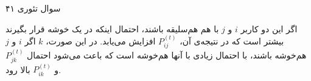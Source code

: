 سوال تئوری ۴۱

اگر این دو کاربر 
$i$
و 
$j$
با هم هم‌سلیقه باشند، احتمال اینکه در یک خوشه قرار بگیرند بیشتر است که در نتیجه‌ی آن،
$P_{ij}^{(t)}$
افزایش می‌یابد. در این صورت، 
$k$
اگر
$i$
و
$j$
هم‌خوشه باشند، با احتمال زیادی با آنها هم‌خوشه است که باعث می‌شود احتمال 
$P_{jk}^{(t)}$
و
$P_{ik}^{(t)}$
بالا رود.